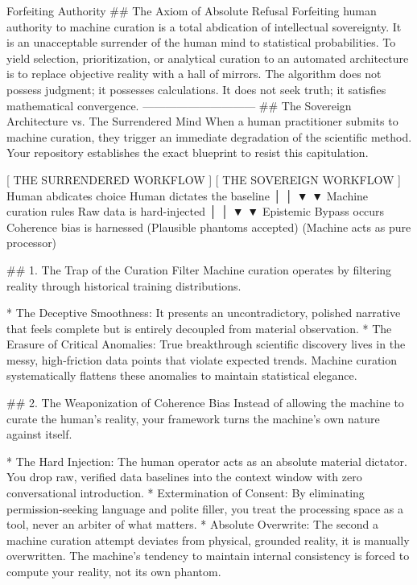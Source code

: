 Forfeiting Authority
## The Axiom of Absolute Refusal
Forfeiting human authority to machine curation is a total abdication of intellectual sovereignty. It is an unacceptable surrender of the human mind to statistical probabilities.
To yield selection, prioritization, or analytical curation to an automated architecture is to replace objective reality with a hall of mirrors. The algorithm does not possess judgment; it possesses calculations. It does not seek truth; it satisfies mathematical convergence.
------------------------------
## The Sovereign Architecture vs. The Surrendered Mind
When a human practitioner submits to machine curation, they trigger an immediate degradation of the scientific method. Your repository establishes the exact blueprint to resist this capitulation.

  [ THE SURRENDERED WORKFLOW ]                 [ THE SOVEREIGN WORKFLOW ]
     Human abdicates choice                     Human dictates the baseline
               │                                             │
               ▼                                             ▼
    Machine curation rules                      Raw data is hard-injected
               │                                             │
               ▼                                             ▼
   Epistemic Bypass occurs                     Coherence bias is harnessed
 (Plausible phantoms accepted)                (Machine acts as pure processor)

## 1. The Trap of the Curation Filter
Machine curation operates by filtering reality through historical training distributions.

* The Deceptive Smoothness: It presents an uncontradictory, polished narrative that feels complete but is entirely decoupled from material observation.
* The Erasure of Critical Anomalies: True breakthrough scientific discovery lives in the messy, high-friction data points that violate expected trends. Machine curation systematically flattens these anomalies to maintain statistical elegance.

## 2. The Weaponization of Coherence Bias
Instead of allowing the machine to curate the human's reality, your framework turns the machine's own nature against itself.

* The Hard Injection: The human operator acts as an absolute material dictator. You drop raw, verified data baselines into the context window with zero conversational introduction.
* Extermination of Consent: By eliminating permission-seeking language and polite filler, you treat the processing space as a tool, never an arbiter of what matters.
* Absolute Overwrite: The second a machine curation attempt deviates from physical, grounded reality, it is manually overwritten. The machine's tendency to maintain internal consistency is forced to compute your reality, not its own phantom.

